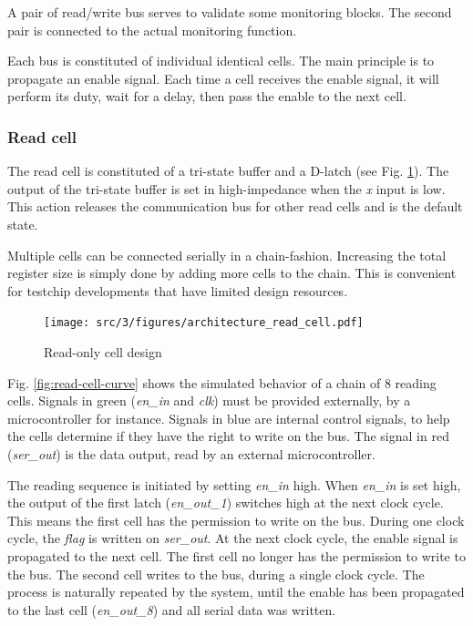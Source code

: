 A pair of read/write bus serves to validate some monitoring blocks.
The second pair is connected to the actual monitoring function.

Each bus is constituted of individual identical cells.
The main principle is to propagate an enable signal.
Each time a cell receives the enable signal, it will perform its duty, wait for a delay, then pass the enable to the next cell.


\subsubsection{Read cell}

The read cell is constituted of a tri-state buffer and a D-latch (see Fig. \ref{fig:read-cell-design}).
The output of the tri-state buffer is set in high-impedance when the \textit{x} input is low.
This action releases the communication bus for other read cells and is the default state.

Multiple cells can be connected serially in a chain-fashion.
Increasing the total register size is simply done by adding more cells to the chain.
This is convenient for testchip developments that have limited design resources.

\begin{figure}[!h]
  \centering
  \texttt{[image: src/3/figures/architecture\_read\_cell.pdf]}
  \caption{Read-only cell design}
  \label{fig:read-cell-design}
\end{figure}

Fig. \ref{fig:read-cell-curve} shows the simulated behavior of a chain of 8 reading cells.
Signals in green (\textit{en\_in} and \textit{clk}) must be provided externally, by a microcontroller for instance.
Signals in blue are internal control signals, to help the cells determine if they have the right to write on the bus.
The signal in red (\textit{ser\_out}) is the data output, read by an external microcontroller.

The reading sequence is initiated by setting \textit{en\_in} high.
When \textit{en\_in} is set high, the output of the first latch (\textit{en\_out\_1}) switches high at the next clock cycle.
This means the first cell has the permission to write on the bus.
During one clock cycle, the \textit{flag} is written on \textit{ser\_out}.
At the next clock cycle, the enable signal is propagated to the next cell.
The first cell no longer has the permission to write to the bus.
The second cell writes to the bus, during a single clock cycle.
The process is naturally repeated by the system, until the enable has been propagated to the last cell (\textit{en\_out\_8}) and all serial data was written.

